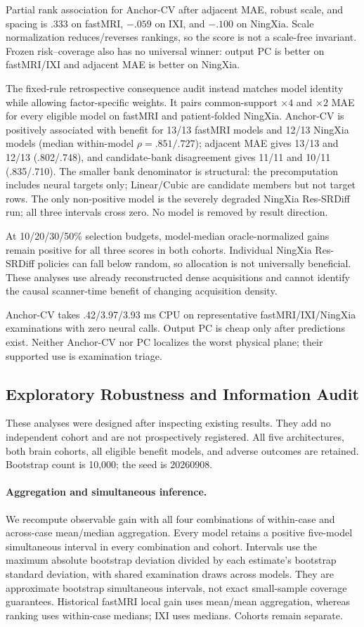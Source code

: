 Partial rank association for Anchor-CV after adjacent MAE, robust scale, and spacing is .333 on fastMRI, $-.059$ on IXI, and $-.100$ on NingXia. Scale normalization reduces/reverses rankings, so the score is not a scale-free invariant. Frozen risk--coverage also has no universal winner: output PC is better on fastMRI/IXI and adjacent MAE is better on NingXia.

The fixed-rule retrospective consequence audit instead matches model identity while allowing factor-specific weights. It pairs common-support $\times4$ and $\times2$ MAE for every eligible model on fastMRI and patient-folded NingXia. Anchor-CV is positively associated with benefit for 13/13 fastMRI models and 12/13 NingXia models (median within-model $\rho=.851/.727$); adjacent MAE gives 13/13 and 12/13 (.802/.748), and candidate-bank disagreement gives 11/11 and 10/11 (.835/.710). The smaller bank denominator is structural: the precomputation includes neural targets only; Linear/Cubic are candidate members but not target rows. The only non-positive model is the severely degraded NingXia Res-SRDiff run; all three intervals cross zero. No model is removed by result direction.

At 10/20/30/50\% selection budgets, model-median oracle-normalized gains remain positive for all three scores in both cohorts. Individual NingXia Res-SRDiff policies can fall below random, so allocation is not universally beneficial. These analyses use already reconstructed dense acquisitions and cannot identify the causal scanner-time benefit of changing acquisition density.

Anchor-CV takes .42/3.97/3.93 ms CPU on representative fastMRI/IXI/NingXia examinations with zero neural calls. Output PC is cheap only after predictions exist. Neither Anchor-CV nor PC localizes the worst physical plane; their supported use is examination triage.

\subsection{Exploratory Robustness and Information Audit}
These analyses were designed after inspecting existing results. They add no independent cohort and are not prospectively registered. All five architectures, both brain cohorts, all eligible benefit models, and adverse outcomes are retained. Bootstrap count is 10,000; the seed is 20260908.

\paragraph{Aggregation and simultaneous inference.}
We recompute observable gain with all four combinations of within-case and across-case mean/median aggregation. Every model retains a positive five-model simultaneous interval in every combination and cohort. Intervals use the maximum absolute bootstrap deviation divided by each estimate's bootstrap standard deviation, with shared examination draws across models. They are approximate bootstrap simultaneous intervals, not exact small-sample coverage guarantees. Historical fastMRI local gain uses mean/mean aggregation, whereas ranking uses within-case medians; IXI uses medians. Cohorts remain separate.

